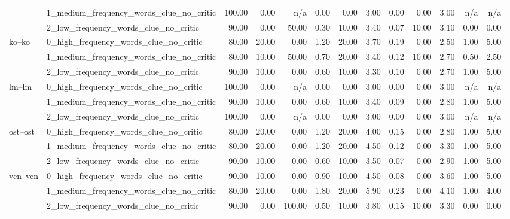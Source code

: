 \begin{tabular}{llrrrrrrrrrrr}
 & 1_medium_frequency_words_clue_no_critic & 100.00 & 0.00 & n/a & 0.00 & 0.00 & 3.00 & 0.00 & 0.00 & 3.00 & n/a & n/a \\
 & 2_low_frequency_words_clue_no_critic & 90.00 & 0.00 & 50.00 & 0.30 & 10.00 & 3.40 & 0.07 & 10.00 & 3.10 & 0.00 & 0.00 \\
\cline{1-13}
\multirow[t]{3}{*}{ko--ko} & 0_high_frequency_words_clue_no_critic & 80.00 & 20.00 & 0.00 & 1.20 & 20.00 & 3.70 & 0.19 & 0.00 & 2.50 & 1.00 & 5.00 \\
 & 1_medium_frequency_words_clue_no_critic & 80.00 & 10.00 & 50.00 & 0.70 & 20.00 & 3.40 & 0.12 & 10.00 & 2.70 & 0.50 & 2.50 \\
 & 2_low_frequency_words_clue_no_critic & 90.00 & 10.00 & 0.00 & 0.60 & 10.00 & 3.30 & 0.10 & 0.00 & 2.70 & 1.00 & 5.00 \\
\cline{1-13}
\multirow[t]{3}{*}{lm--lm} & 0_high_frequency_words_clue_no_critic & 100.00 & 0.00 & n/a & 0.00 & 0.00 & 3.00 & 0.00 & 0.00 & 3.00 & n/a & n/a \\
 & 1_medium_frequency_words_clue_no_critic & 90.00 & 10.00 & 0.00 & 0.60 & 10.00 & 3.40 & 0.09 & 0.00 & 2.80 & 1.00 & 5.00 \\
 & 2_low_frequency_words_clue_no_critic & 100.00 & 0.00 & n/a & 0.00 & 0.00 & 3.00 & 0.00 & 0.00 & 3.00 & n/a & n/a \\
\cline{1-13}
\multirow[t]{3}{*}{ost--ost} & 0_high_frequency_words_clue_no_critic & 80.00 & 20.00 & 0.00 & 1.20 & 20.00 & 4.00 & 0.15 & 0.00 & 2.80 & 1.00 & 5.00 \\
 & 1_medium_frequency_words_clue_no_critic & 80.00 & 20.00 & 0.00 & 1.20 & 20.00 & 4.50 & 0.12 & 0.00 & 3.30 & 1.00 & 5.00 \\
 & 2_low_frequency_words_clue_no_critic & 90.00 & 10.00 & 0.00 & 0.60 & 10.00 & 3.50 & 0.07 & 0.00 & 2.90 & 1.00 & 5.00 \\
\cline{1-13}
\multirow[t]{3}{*}{vcn--vcn} & 0_high_frequency_words_clue_no_critic & 90.00 & 10.00 & 0.00 & 0.90 & 10.00 & 4.50 & 0.08 & 0.00 & 3.60 & 1.00 & 5.00 \\
 & 1_medium_frequency_words_clue_no_critic & 80.00 & 20.00 & 0.00 & 1.80 & 20.00 & 5.90 & 0.23 & 0.00 & 4.10 & 1.00 & 4.00 \\
 & 2_low_frequency_words_clue_no_critic & 90.00 & 0.00 & 100.00 & 0.50 & 10.00 & 3.80 & 0.15 & 10.00 & 3.30 & 0.00 & 0.00 \\
\cline{1-13}
\bottomrule
\end{tabular}
